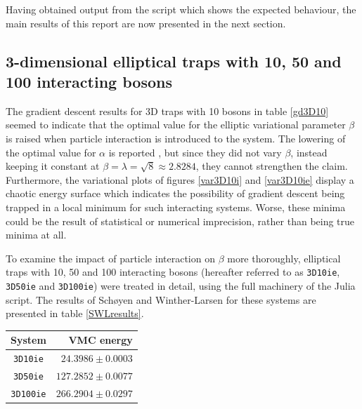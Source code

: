 \documentclass[a4paper,8pt]{article}
\begin{document}
\begin{multicols}{2}
Having obtained output from the script which shows the expected behaviour, the main results of this report are now presented in the next section.



\subsection{3-dimensional elliptical traps with 10, 50 and 100 interacting bosons}\label{3Die}
The gradient descent results for 3D traps with 10 bosons in table \ref{gd3D10} seemed to indicate that the optimal value for the elliptic variational parameter $\beta$ is raised when particle interaction is introduced to the system. The lowering of the optimal value for $\alpha$ is reported \cite{SWL}, but since they did not vary $\beta$, instead keeping it constant at ${\beta = \lambda = \sqrt{8} \approx 2.8284}$, they cannot strengthen the claim. Furthermore, the variational plots of figures \ref{var3D10i} and \ref{var3D10ie} display a chaotic energy surface which indicates the possibility of gradient descent being trapped in a local minimum for such interacting systems. Worse, these minima could be the result of statistical or numerical imprecision, rather than being true minima at all.

To examine the impact of particle interaction on $\beta$ more thoroughly, elliptical traps with 10, 50 and 100 interacting bosons (hereafter referred to as \texttt{3D10ie}, \texttt{3D50ie} and \texttt{3D100ie}) were treated in detail, using the full machinery of the Julia script. The results of Schøyen and Winther-Larsen for these systems are presented in table \ref{SWLresults}.

\begin{center}\small
{}
\label{SWLresults}
\begin{tabular}{cr}
	\hline\hline
	System & VMC energy \\
	\hline
    \texttt{3D10ie} & $24.3986 \pm 0.0003$\\
    \texttt{3D50ie} & $127.2852 \pm 0.0077$\\
    \texttt{3D100ie} & $266.2904 \pm 0.0297$\\
    \hline\hline
\end{tabular}
\end{center}


\end{multicols}
\end{document}
